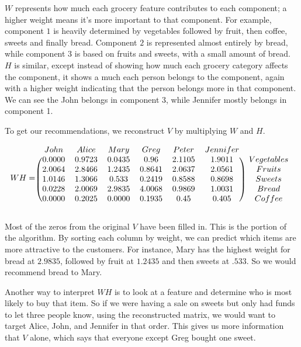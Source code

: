 $W$ represents how much each grocery feature contributes to each component; a higher weight means it's more important to that component.
For example, component $1$ is heavily determined by vegetables followed by fruit, then coffee, sweets and finally bread.
Component $2$ is represented almost entirely by bread, while component $3$ is based on fruits and sweets, with a small amount of bread.
$H$ is similar, except instead of showing how much each grocery category affects the component, it shows a much each person belongs to the component, again with a higher weight indicating that the person belongs more in that component.
We can see the John belongs in component $3$, while Jennifer mostly belongs in component 1.

To get our recommendations, we reconstruct $V$ by multiplying $W$ and $H$.

\[
WH = 
\begin{blockarray}{ccccccc}
  John&  Alice  &Mary & Greg & Peter & Jennifer\\
  \begin{block}{(cccccc)c} 	
  0.0000&  0.9723 & 0.0435 & 0.96 & 2.1105 &   1.9011 &Vegetables\\
      2.0064 & 2.8466 & 1.2435 & 0.8641&  2.0637  &  2.0561 &Fruits\\
      1.0146 & 1.3066 &  0.533&  0.2419&  0.8588  &  0.8698 &Sweets\\
       0.0228 & 2.0069 & 2.9835 & 4.0068 & 0.9869 &   1.0031 &Bread\\
     0.0000 & 0.2025 & 0.0000&  0.1935 & 0.45  &  0.405 &Coffee\\
   \end{block}
   \end{blockarray}
\]

Most of the zeros from the original $V$ have been filled in.
This is the  portion of the algorithm.
By sorting each column by weight, we can predict which items are more attractive to the customers.
For instance, Mary has the highest weight for bread at $2.9835$, followed by fruit at $1.2435$ and then sweets at $.533$.
So we would recommend bread to Mary.

Another way to interpret $WH$ is to look at a feature and determine who is most likely to buy that item.
So if we were having a sale on sweets but only had funds to let three people know, using the reconstructed matrix, we would want to target Alice, John, and Jennifer in that order.
This gives us more information that $V$ alone, which says that everyone except Greg bought one sweet.

